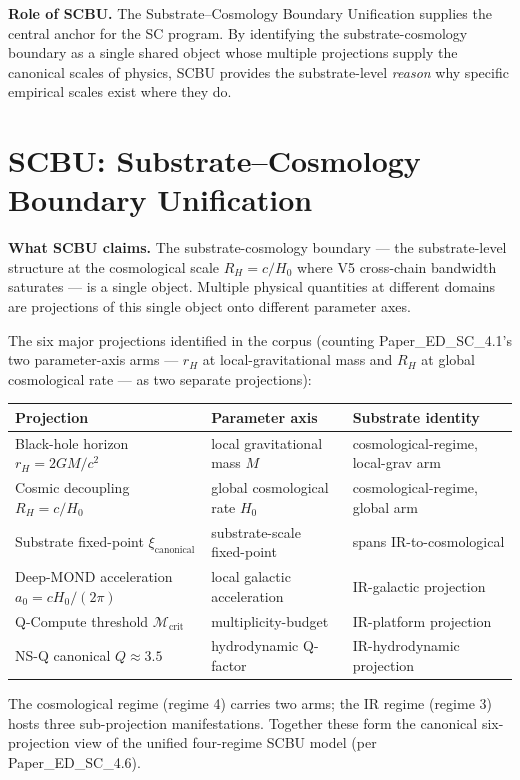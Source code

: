 \documentclass[11pt,a4paper]{article}
\begin{document}
\textbf{Role of SCBU.} The Substrate--Cosmology Boundary Unification supplies the central anchor for the SC program. By identifying the substrate-cosmology boundary as a single shared object whose multiple projections supply the canonical scales of physics, SCBU provides the substrate-level \emph{reason} why specific empirical scales exist where they do.

\section{SCBU: Substrate--Cosmology Boundary Unification}

\textbf{What SCBU claims.} The substrate-cosmology boundary --- the substrate-level structure at the cosmological scale $R_H = c / H_0$ where V5 cross-chain bandwidth saturates --- is a single object. Multiple physical quantities at different domains are projections of this single object onto different parameter axes.

The six major projections identified in the corpus (counting Paper\_ED\_SC\_4.1's two parameter-axis arms --- $r_H$ at local-gravitational mass and $R_H$ at global cosmological rate --- as two separate projections):

\begin{center}
\footnotesize
\begin{tabular}{p{}p{}p{}}
\toprule
\textbf{Projection} & \textbf{Parameter axis} & \textbf{Substrate identity} \\
\midrule
Black-hole horizon $r_H = 2GM/c^2$ & local gravitational mass $M$ & cosmological-regime, local-grav arm \\
Cosmic decoupling $R_H = c/H_0$ & global cosmological rate $H_0$ & cosmological-regime, global arm \\
Substrate fixed-point $\xi_\mathrm{canonical}$ & substrate-scale fixed-point & spans IR-to-cosmological \\
Deep-MOND acceleration $a_0 = c H_0/(2\pi)$ & local galactic acceleration & IR-galactic projection \\
Q-Compute threshold $\mathcal{M}_\mathrm{crit}$ & multiplicity-budget & IR-platform projection \\
NS-Q canonical $Q \approx 3.5$ & hydrodynamic Q-factor & IR-hydrodynamic projection \\
\bottomrule
\end{tabular}
\end{center}

The cosmological regime (regime 4) carries two arms; the IR regime (regime 3) hosts three sub-projection manifestations. Together these form the canonical six-projection view of the unified four-regime SCBU model (per Paper\_ED\_SC\_4.6).
\end{document}
